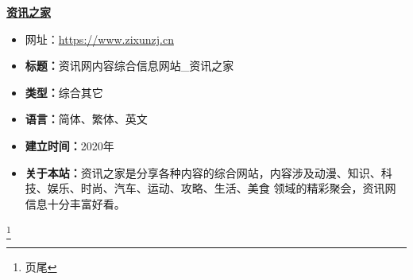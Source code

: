 \textbf{\href{https://www.zixunzj.cn}{资讯之家}}
\begin{itemize}
\item 网址：\href{https://www.zixunzj.cn}{https://www.zixunzj.cn}
\item \textbf{标题：}资讯网内容综合信息网站_资讯之家
\item \textbf{类型：}综合其它
\item \textbf{ 语言：}简体、繁体、英文
\item \textbf{建立时间：}2020年
\item \textbf{关于本站：}资讯之家是分享各种内容的综合网站，内容涉及动漫、知识、科技、娱乐、时尚、汽车、运动、攻略、生活、美食 领域的精彩聚会，资讯网信息十分丰富好看。
\end{itemize}
\footnote{页尾}



